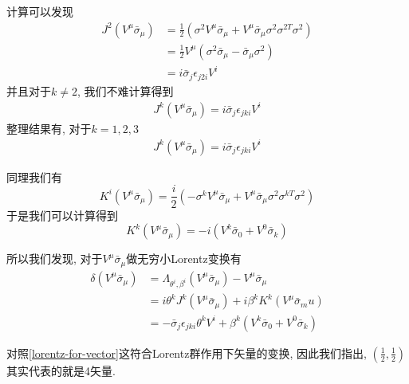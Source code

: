 \begin{example}
    计算可以发现
    \begin{align}
        J^2(V^\mu\bar\sigma_\mu)&=\frac12(\sigma^2V^\mu\bar\sigma_\mu+V^\mu\bar\sigma_\mu\sigma^2\sigma^{2T}\sigma^2)\\
        &=\frac12V^\mu(\sigma^2\bar\sigma_\mu-\bar\sigma_\mu\sigma^2)\\
        &=i\bar\sigma_j\epsilon_{j2i}V^i
    \end{align}
    并且对于$k\neq2$, 我们不难计算得到
    \begin{align}
        J^k(V^\mu\bar\sigma_\mu)=i\bar\sigma_j\epsilon_{jki}V^i
    \end{align}
    整理结果有, 对于$k=1,2,3$
    \begin{align}
        J^k(V^\mu\bar\sigma_\mu)=i\bar\sigma_j\epsilon_{jki}V^i
    \end{align}

    同理我们有
    \begin{equation}
        K^i(V^\mu\bar\sigma_\mu)=\frac i2(-\sigma^kV^\mu\bar\sigma_\mu+V^\mu\bar\sigma_\mu\sigma^2\sigma^{kT}\sigma^2)
    \end{equation}
    于是我们可以计算得到
    \begin{equation}
        K^k(V^\mu\bar\sigma_\mu)=-i(V^k\bar\sigma_0+V^0\bar\sigma_k)
    \end{equation}

    所以我们发现, 对于$V^\mu\bar\sigma_\mu$做无穷小Lorentz变换有
    \begin{align}
        \delta(V^\mu\bar\sigma_\mu)&=\Lambda_{\theta^i, \beta^i}(V^\mu\bar\sigma_\mu)-V^\mu\bar\sigma_\mu\\
        &=i\theta^kJ^k(V^\mu\bar\sigma_\mu)+i\beta^kK^k(V^\mu\bar\sigma_mu)\\
        &=-\bar\sigma_j\epsilon_{jki}\theta^kV^i+\beta^k(V^k\bar\sigma_0+V^0\bar\sigma_k)
    \end{align}

    对照\eqref{lorentz-for-vector}这符合Lorentz群作用下矢量的变换, 因此我们指出, $(\frac12, \frac12)$其实代表的就是4矢量.
\end{example}
